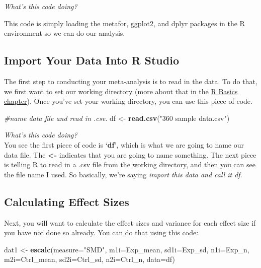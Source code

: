 \documentclass[
]{book}
\newenvironment{Shaded}{\begin{snugshade}}{\end{snugshade}}
\newcommand{\AttributeTok}[1]{\textcolor[rgb]{0.13,0.29,0.53}{#1}}
\newcommand{\CommentTok}[1]{\textcolor[rgb]{0.56,0.35,0.01}{\textit{#1}}}
\newcommand{\FunctionTok}[1]{\textcolor[rgb]{0.13,0.29,0.53}{\textbf{#1}}}
\newcommand{\NormalTok}[1]{#1}
\newcommand{\OtherTok}[1]{\textcolor[rgb]{0.56,0.35,0.01}{#1}}
\newcommand{\StringTok}[1]{\textcolor[rgb]{0.31,0.60,0.02}{#1}}
\begin{document}
\emph{What's this code doing?}

This code is simply loading the metafor, ggplot2, and dplyr packages in the R environment so we can do our analysis.

\hypertarget{import-your-data-into-r-studio-1}{%
\subsection{Import Your Data Into R Studio}\label{import-your-data-into-r-studio-1}}

The first step to conducting your meta-analysis is to read in the data. To do that, we first want to set our working directory (more about that in the \protect\hyperlink{crossrbasics}{R Basics chapter}). Once you've set your working directory, you can use this piece of code.

\begin{Shaded}
\begin{Highlighting}[]
\CommentTok{\#name data file and read in .csv.}
\NormalTok{df }\OtherTok{\textless{}{-}} \FunctionTok{read.csv}\NormalTok{(}\StringTok{"360 sample data.csv"}\NormalTok{)}
\end{Highlighting}
\end{Shaded}

\emph{What's this code doing?\\
}You see the first piece of code is `\textbf{df}', which is what we are going to name our data file. The \textbf{\textless-} indicates that you are going to name something. The next piece is telling R to read in a .csv file from the working directory, and then you can see the file name I used. So basically, we're saying \emph{import this data and call it df}.

\hypertarget{calculating-effect-sizes-1}{%
\subsection{Calculating Effect Sizes}\label{calculating-effect-sizes-1}}

Next, you will want to calculate the effect sizes and variance for each effect size if you have not done so already. You can do that using this code:

\begin{Shaded}
\begin{Highlighting}[]
\NormalTok{dat1 }\OtherTok{\textless{}{-}} \FunctionTok{escalc}\NormalTok{(}\AttributeTok{measure=}\StringTok{"SMD"}\NormalTok{, }\AttributeTok{m1i=}\NormalTok{Exp\_mean, }\AttributeTok{sd1i=}\NormalTok{Exp\_sd, }\AttributeTok{n1i=}\NormalTok{Exp\_n,}
               \AttributeTok{m2i=}\NormalTok{Ctrl\_mean, }\AttributeTok{sd2i=}\NormalTok{Ctrl\_sd, }\AttributeTok{n2i=}\NormalTok{Ctrl\_n, }\AttributeTok{data=}\NormalTok{df)}
\end{Highlighting}
\end{Shaded}
\end{document}
